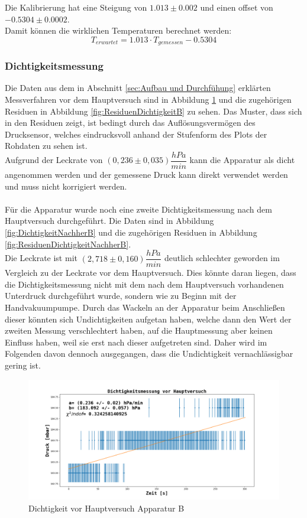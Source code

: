 \documentclass[12pt,a4paper]{article}
\begin{document}
Die Kalibrierung hat eine Steigung von $1.013\pm 0.002$ und einen offset von $-0.5304\pm 0.0002$.\\
Damit können die wirklichen Temperaturen berechnet werden:
\begin{equation}
T_{erwartet}=1.013\cdot T_{gemessen}-0.5304
\end{equation}

\subsubsection{Dichtigkeitsmessung}
Die Daten aus dem in Abschnitt \ref{sec:Aufbau und Durchfühung} erklärten Messverfahren vor dem Hauptversuch sind in Abbildung \ref{fig:DichtigkeitB} und die zugehörigen Residuen in Abbildung \ref{fig:ResiduenDichtigkeitB} zu sehen. Das Muster, dass sich in den Residuen zeigt, ist bedingt durch das Auflösungsvermögen des Drucksensor, welches eindrucksvoll anhand der Stufenform des Plots der Rohdaten zu sehen ist. \\
Aufgrund der Leckrate von $(0,236 \pm 0,035) \dfrac{hPa}{min}$ kann die Apparatur als dicht angenommen werden und der gemessene Druck kann direkt verwendet werden und muss nicht korrigiert werden.\\
\\Für die Apparatur wurde noch eine zweite Dichtigkeitsmessung nach dem Hauptversuch durchgeführt. Die Daten sind in Abbildung \ref{fig:DichtigkeitNachherB} und die zugehörigen Residuen in Abbildung \ref{fig:ResiduenDichtigkeitNachherB}.\\
Die Leckrate ist mit $(2,718 \pm 0,160) \dfrac{hPa}{min}$ deutlich schlechter geworden im Vergleich zu der Leckrate vor dem Hauptversuch. Dies könnte daran liegen, dass die Dichtigkeitsmessung nicht mit dem nach dem Hauptversuch vorhandenen Unterdruck durchgeführt wurde, sondern wie zu Beginn mit der Handvakuumpumpe. Durch das Wackeln an der Apparatur beim Anschließen dieser könnten sich Undichtigkeiten aufgetan haben, welche dann den Wert der zweiten Messung verschlechtert haben, auf die Hauptmessung aber keinen Einfluss haben, weil sie erst nach dieser aufgetreten sind. Daher wird im Folgenden davon dennoch ausgegangen, dass die Undichtigkeit vernachlässigbar gering ist.

\begin{figure}
\includegraphics[width=\linewidth]{Bilder/Dichtigkeit_vorher_B.png}
\caption[Dichtigkeit vor Hauptversuch Apparatur B]{Dichtigkeit vor Hauptversuch Apparatur B}
\label{fig:DichtigkeitB}
\end{figure}
\end{document}

